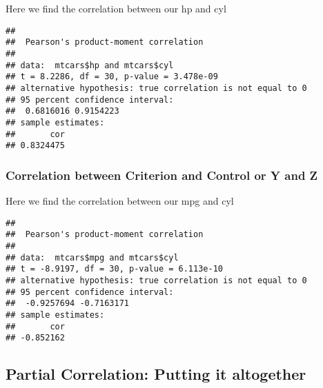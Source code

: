 \documentclass[
]{book}
\newenvironment{Shaded}{\begin{snugshade}}{\end{snugshade}}
\newcommand{\FunctionTok}[1]{\textcolor[rgb]{0.13,0.29,0.53}{\textbf{#1}}}
\newcommand{\NormalTok}[1]{#1}
\newcommand{\SpecialCharTok}[1]{\textcolor[rgb]{0.81,0.36,0.00}{\textbf{#1}}}
\theoremstyle{definition}
\theoremstyle{definition}
\theoremstyle{definition}
\theoremstyle{definition}
\theoremstyle{remark}
\begin{document}
Here we find the correlation between our hp and cyl

\begin{Shaded}
\end{Shaded}

\begin{verbatim}
## 
##  Pearson's product-moment correlation
## 
## data:  mtcars$hp and mtcars$cyl
## t = 8.2286, df = 30, p-value = 3.478e-09
## alternative hypothesis: true correlation is not equal to 0
## 95 percent confidence interval:
##  0.6816016 0.9154223
## sample estimates:
##       cor 
## 0.8324475
\end{verbatim}

\hypertarget{correlation-between-criterion-and-control-or-y-and-z}{%
\subsubsection{Correlation between Criterion and Control or Y and Z}\label{correlation-between-criterion-and-control-or-y-and-z}}

Here we find the correlation between our mpg and cyl

\begin{Shaded}
\end{Shaded}

\begin{verbatim}
## 
##  Pearson's product-moment correlation
## 
## data:  mtcars$mpg and mtcars$cyl
## t = -8.9197, df = 30, p-value = 6.113e-10
## alternative hypothesis: true correlation is not equal to 0
## 95 percent confidence interval:
##  -0.9257694 -0.7163171
## sample estimates:
##       cor 
## -0.852162
\end{verbatim}

\hypertarget{partial-correlation-putting-it-altogether}{%
\subsection{Partial Correlation: Putting it altogether}\label{partial-correlation-putting-it-altogether}}
\end{document}
